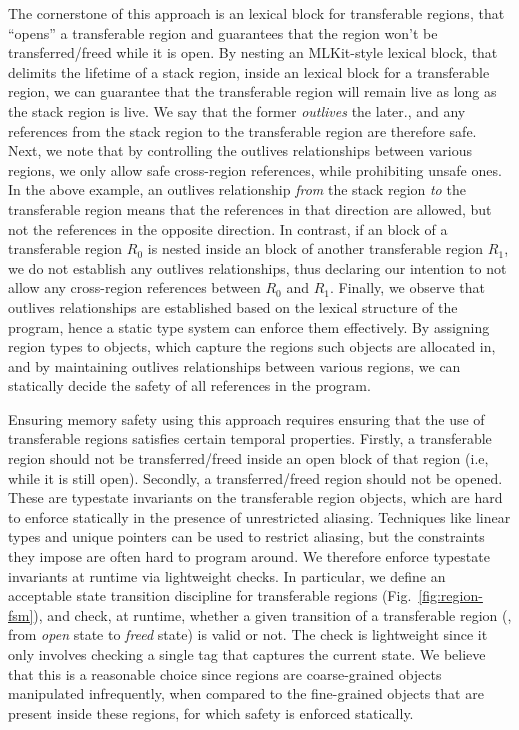 The cornerstone of this approach is an  lexical block for transferable regions,
that ``opens'' a transferable region and guarantees that the region
won't be transferred/freed while it is open. By nesting an
MLKit-style  lexical block, that delimits
the lifetime of a stack region, inside an  lexical block for a
transferable region, we can guarantee that the transferable region
will remain live as long as the stack region is live. We say that the
former \emph{outlives} the later., and any references from the stack
region to the transferable region are therefore safe.  Next, we note
that by controlling the outlives relationships between various
regions, we only allow safe cross-region references, while prohibiting
unsafe ones. In the above example, an outlives relationship
\emph{from} the stack region \emph{to} the transferable region means
that the references in that direction are allowed, but not the
references in the opposite direction. In contrast, if an 
block of a transferable region $R_0$ is nested inside an 
block of another transferable region $R_1$, we do not establish any
outlives relationships, thus declaring our intention to not allow any
cross-region references between $R_0$ and $R_1$.  Finally, we observe
that outlives relationships are established based on the lexical
structure of the program, hence a static type system can enforce them
effectively. By assigning region types to objects, which capture the
regions such objects are allocated in, and by maintaining outlives
relationships between various regions, we can statically decide the
safety of all references in the program.

Ensuring memory safety using this approach requires ensuring
that the use of transferable regions satisfies certain temporal properties.
Firstly, a transferable region should not be transferred/freed
inside an open block of that region (i.e, while it is still open).
Secondly, a transferred/freed region should not be opened. These are
typestate invariants on the transferable region objects, which are
hard to enforce statically in the presence of unrestricted
aliasing. Techniques like linear types and unique pointers can be used
to restrict aliasing, but the constraints they impose are often hard
to program around. We therefore enforce typestate invariants at
runtime via lightweight checks. In particular, we define an acceptable
state transition discipline for transferable regions
(Fig.~\ref{fig:region-fsm}), and check, at runtime, whether a given
transition of a transferable region (\eg, from \emph{open} state to
\emph{freed} state) is valid or not. The check is lightweight since it
only involves checking a single tag that captures the current state.
We believe that this is a reasonable choice since regions are
coarse-grained objects manipulated infrequently, when compared to the
fine-grained objects that are present inside these regions, for which
safety is enforced statically. 

